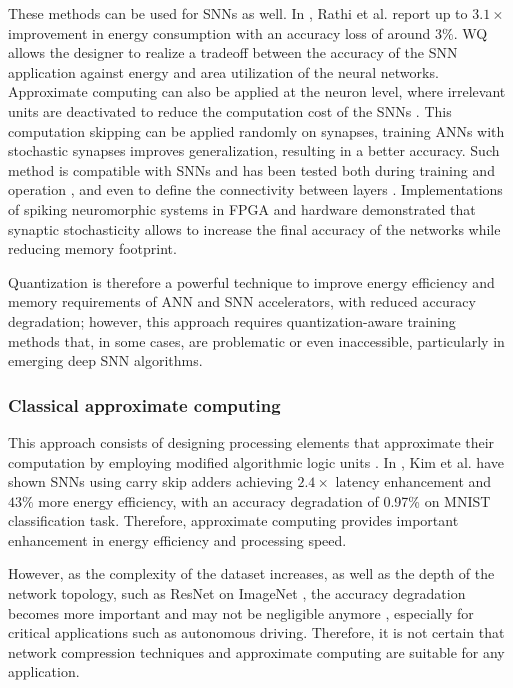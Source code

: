 These methods can be used for SNNs as well. In \cite{rathi2018stdp}, Rathi et al. report up to $3.1\times$ improvement in energy consumption with an accuracy loss of around $3\%$. WQ allows the designer to realize a tradeoff between the accuracy of the SNN application against energy and area utilization of the neural networks. Approximate computing can also be applied at the neuron level, where irrelevant units are deactivated to reduce the computation cost of the SNNs \cite{sen2017approximate}. This computation skipping can be applied randomly on synapses, training ANNs with stochastic synapses improves generalization, resulting in a better accuracy\cite{srivastava2014dropout, wan2013regularization}. Such method is compatible with SNNs and has been tested both during training \cite{neftci2016stochastic, srinivasan2016magnetic} and operation \cite{buesing2011neural}, and even to define the connectivity between layers \cite{bellec2017deep, chen20184096}. Implementations of spiking neuromorphic systems in FPGA \cite{sheik2016synaptic} and hardware \cite{jerry2017ultra} demonstrated that synaptic stochasticity allows to increase the final accuracy of the networks while reducing memory footprint.

Quantization is therefore a powerful technique to improve energy efficiency and memory requirements of ANN and SNN accelerators, with reduced accuracy degradation; however, this approach requires quantization-aware training methods that, in some cases, are problematic or even inaccessible, particularly in emerging deep SNN algorithms\cite{zhang2018survey}.

\subsubsection{Classical approximate computing}
This approach consists of designing processing elements that approximate their computation by employing modified algorithmic logic units \cite{han2013approximate}. In \cite{kim2013energy}, Kim et al. have shown SNNs using carry skip adders achieving $2.4\times$ latency enhancement and $43\%$ more energy efficiency, with an accuracy degradation of 0.97\% on MNIST classification task. Therefore, approximate computing provides important enhancement in energy efficiency and processing speed.

However, as the complexity of the dataset increases, as well as the depth of the network topology, such as ResNet \cite{he2016deep} on ImageNet \cite{russakovsky2015imagenet}, the accuracy degradation becomes more important and may not be negligible anymore \cite{rastegari2016xnor}, especially for critical applications such as autonomous driving. Therefore, it is not certain that network compression techniques and approximate computing are suitable for any application.

